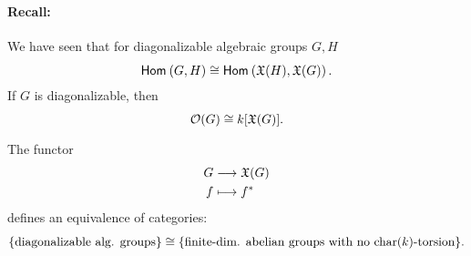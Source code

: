 \paragraph{Recall:} We have seen that for diagonalizable algebraic groups $G,H$
\[ \textsf{Hom}_{}\left(G, H\right) \overset{}{\cong} \textsf{Hom}_{}\left(\mathfrak{X}(H), \mathfrak{X}(G)\right). \]
If $G$ is diagonalizable, then
\[ \mathcal{O}(G) \overset{}{\cong} k[\mathfrak{X}(G)]. \]

\begin{theorem}
The functor
\begin{align*}
G & \overset{}{\longrightarrow} \mathfrak{X}(G)\\
f &\longmapsto f^*
\end{align*}
defines an equivalence of categories:
\[ \{\text{diagonalizable alg. groups}\} \overset{}{\cong} \{ \text{finite-dim. abelian groups with no }\mathrm{char}(k)\text{-torsion} \}. \]
\end{theorem}

